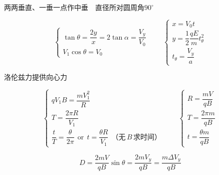 两两垂直、一垂一点作中垂\ \ 直径所对圆周角$90^\circ$




\[
\begin{cases}\tan\theta=\dfrac{2y}{x}=2\tan\alpha=\dfrac{V_y}{V_0}\\[6pt] V_1\cos\theta=V_0\end{cases}
\qquad
\begin{cases}x=V_0t\\[2pt] y=\dfrac{1}{2}\dfrac{qE}{m}t_{\theta}^{2}\\[4pt] t_{\theta}=\dfrac{V_y}{a}\end{cases}
\]

洛伦兹力提供向心力

\[
\begin{cases}qV_1B=\dfrac{mV_1^{2}}{R}\\[6pt] T=\dfrac{2\pi R}{V_1}\\[6pt] \dfrac{t}{T}=\dfrac{\theta}{2\pi}\ \ \text{or}\ \ t=\dfrac{\theta R}{V_1}\ \ \text{（无}\,B\,\text{求时间）}\end{cases}
\qquad
\begin{cases}R=\dfrac{mV}{qB}\\[6pt] T=\dfrac{2\pi m}{qB}\\[6pt] t=\dfrac{\theta m}{qB}\end{cases}
\]

\[ D=\frac{2mV}{qB}\sin\theta=\frac{2mV_y}{qB}=\frac{m\Delta V_y}{qB} \]

